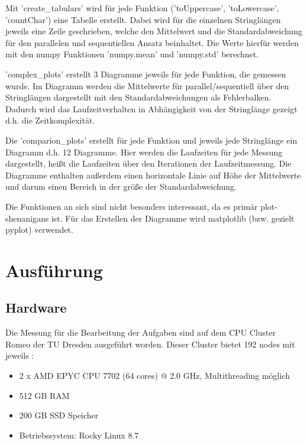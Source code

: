 \documentclass[plainarticle,zihtitle,german,final,hyperref,utf8]{zihpub}
\begin{document}
Mit 'create\_tabulars' wird für jede Funktion ('toUppercase', 'toLowercase', 'countChar') eine Tabelle erstellt. Dabei wird für die einzelnen Stringlängen jeweils eine Zeile geschrieben, welche den Mittelwert und die Standardabweichung für den parallelen und sequentiellen Ansatz beinhaltet. Die Werte hierfür werden mit den numpy Funktionen 'numpy.mean' und 'numpy.std' berechnet.

'complex\_plots' erstellt 3 Diagramme jeweils für jede Funktion, die gemessen wurde. Im Diagramm werden die Mittelwerte für parallel/sequentiell über den Stringlängen dargestellt mit den Standardabweichungen als Fehlerbalken. Dadurch wird das Laufzeitverhalten in Abhängigkeit von der Stringlänge gezeigt d.h. die Zeitkomplexität.

Die 'comparion\_plots' erstellt für jede Funktion und jeweils jede Stringlänge ein Diagramm d.h. 12 Diagramme.
Hier werden die Laufzeiten für jede Messung dargestellt, heißt die Laufzeiten über den Iterationen der Laufzeitmessung. Die Diagramme enthalten außerdem einen horizontale Linie auf Höhe der Mittelwerte und darum einen Bereich in der größe der Standardabweichung.

Die Funktionen an sich sind nicht besonders interessant, da es primär plot-shenanigans ist. Für das Erstellen der Diagramme wird matplotlib (bzw. gezielt pyplot) verwendet.

\section{Ausführung}
\subsection{Hardware}
Die Messung für die Bearbeitung der Aufgaben sind auf dem CPU Cluster Romeo der TU Dresden ausgeführt worden. Dieser Cluster bietet 192 nodes mit jeweils \cite{hpc_compendium}:
\begin{itemize}
\item 2 x AMD EPYC CPU 7702 (64 cores) @ 2.0 GHz, Multithreading möglich \\
\item 512 GB RAM \\
\item 200 GB SSD Speicher \\
\item Betriebssystem: Rocky Linux 8.7 \\
\end{itemize}
\end{document}
